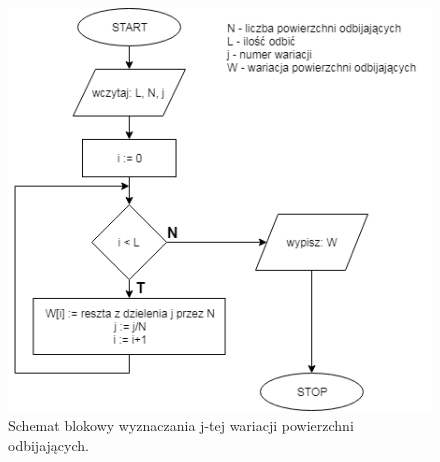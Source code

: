 \begin{figure}[h]
        \centering
                \centering
                \includegraphics[width=12cm]{wariacja}
	\caption{Schemat blokowy wyznaczania j-tej wariacji powierzchni odbijających.}
\end{figure}


